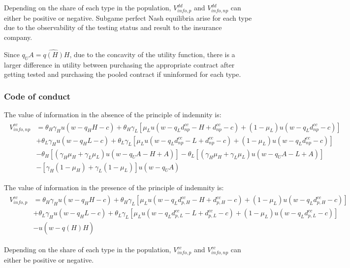 \documentclass[natbib=false,preprint,12pt]{elsarticle}
\theoremstyle{plain}
\theoremstyle{definition}
\theoremstyle{plain}
\theoremstyle{TheoremNum}
\theoremstyle{CorollaryNum}
\theoremstyle{PropositionNum}
\theoremstyle{TheoremNum}
\begin{document}
Depending on the share of each type in the population, $V_{info,p}^{dd}$ and $V_{info,np}^{dd}$ can either be positive or negative. Subgame perfect Nash equilibria arise for each type due to the observability of the testing status and result to the insurance company.

Since $q_U A = \widehat{q(H)}H$, due to the concavity of the utility function, there is a larger difference in utility between purchasing the appropriate contract after getting tested and purchasing the pooled contract if uninformed for each type.



\subsubsection*{Code of conduct}

The value of information in the absence of the principle of indemnity is:
\begin{align}
\begin{split}
    V_{info,np}^{cc} & = \theta_H \gamma_H u(w-q_H H -c) + \theta_H \gamma_L [\mu_L u(w-q_L d_{np}^{cc} - H + d_{np}^{cc}-c) + (1-\mu_L)u(w-q_L d_{np}^{cc}-c)] \\
    & + \theta_L \gamma_H u(w-q_H L-c) + \theta_L \gamma_L [\mu_L u(w-q_L d_{np}^{cc} - L + d_{np}^{cc}-c) + (1-\mu_L)u(w-q_L d_{np}^{cc}-c)] \\
    & - \theta_H [(\gamma_H \mu_H + \gamma_L \mu_L)u(w-q_U A - H + A)] - \theta_L [(\gamma_H \mu_H + \gamma_L \mu_L)u(w-q_U A - L + A)] \\
    & - [\gamma_H (1-\mu_H) + \gamma_L (1-\mu_L)]u(w-q_U A)
\end{split}
\end{align}

The value of information in the presence of the principle of indemnity is:
\begin{align}
\begin{split}
    V_{info,p}^{cc} & = \theta_H \gamma_H u(w-q_H H-c) + \theta_H \gamma_L [\mu_L u(w-q_L d_{p,H}^{cc} - H + d_{p,H}^{cc}-c) + (1-\mu_L)u(w-q_L d_{p,H}^{cc}-c)] \\
    & + \theta_L \gamma_H u(w-q_H L-c) + \theta_L \gamma_L [\mu_L u(w-q_L d_{p,L}^{cc} - L + d_{p,L}^{cc}-c) + (1-\mu_L)u(w-q_L d_{p,L}^{cc}-c)] \\
    & - u(w-\widehat{q(H)}H)
\end{split}
\end{align}

Depending on the share of each type in the population, $V_{info,p}^{cc}$ and $V_{info,np}^{cc}$ can either be positive or negative. 
\end{document}
